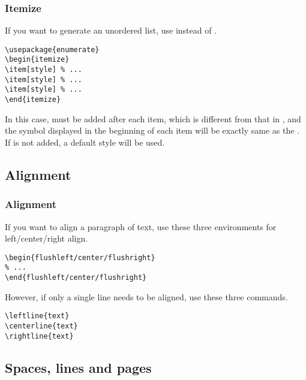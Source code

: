\begin{frame}[fragile]
	\frametitle{Itemize}
	If you want to generate an unordered list, use  instead of .
	\begin{command}
		\begin{verbatim}
\usepackage{enumerate}
\begin{itemize}
\item[style] % ...
\item[style] % ...
\item[style] % ...
\end{itemize}
		\end{verbatim}
	\end{command}
	In this case,  must be added after each item, which is different from that in , and the symbol displayed in the beginning of each item will be exactly same as the . If  is not added, a default style will be used.
\end{frame}

\subsection{Alignment}

\begin{frame}[fragile]
	\frametitle{Alignment}
	If you want to align a paragraph of text, use these three environments for left/center/right align.
	\begin{command}
			\begin{verbatim}
\begin{flushleft/center/flushright}
% ...
\end{flushleft/center/flushright}
			\end{verbatim}
	\end{command}
	However, if only a single line needs to be aligned, use these three commands.
	\begin{command}
		\begin{verbatim}
\leftline{text}
\centerline{text}
\rightline{text}
		\end{verbatim}
	\end{command}
\end{frame}

\subsection{Spaces, lines and pages}

